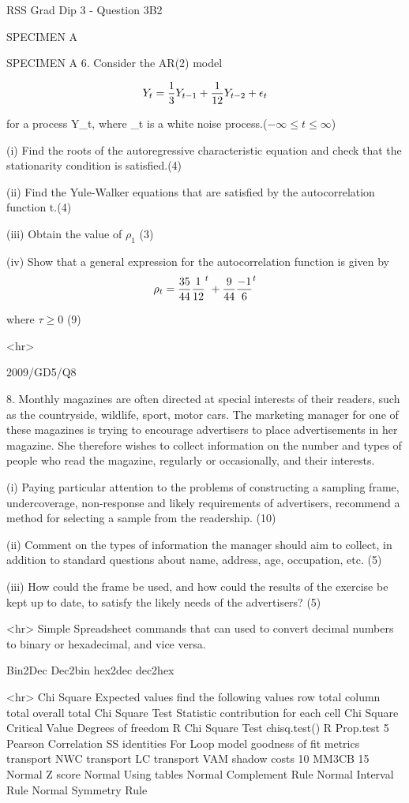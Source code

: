 RSS Grad Dip 3 - Question 3B2
 
 

SPECIMEN A

SPECIMEN A
6. Consider the AR(2) model
 
 
\[Y_t={1\over 3}Y_{t-1}+{1\over 12}Y_{t-2}+ \epsilon_t\]

for a process {Y_t}, where {\epsilon_t} is a white noise process.($-\infty \leq t \leq \infty$)

(i) Find the roots of the autoregressive characteristic equation and check that the stationarity condition is satisfied.(4)
 
(ii) Find the Yule-Walker equations that are satisfied by the autocorrelation function t.(4)
 
(iii) Obtain the value of $\rho_1$        (3)
 
(iv) Show that a general expression for the autocorrelation function is given by
\[\rho_t={35\over 44}{1\over 12}^t +{9\over 44}{-1\over 6}^t
\]

where $\tau \geq 0$     (9)


<hr>

2009/GD5/Q8
 
8. Monthly magazines are often directed at special interests of their readers, such as the countryside, wildlife, sport, motor cars. The marketing manager for one of these magazines is trying to encourage advertisers to place advertisements in her magazine. She therefore wishes to collect information on the number and types of people who read the magazine, regularly or occasionally, and their interests.
 
(i) Paying particular attention to the problems of constructing a sampling frame, undercoverage, non-response and likely requirements of advertisers, recommend a method
for selecting a sample from the readership. (10)
 
(ii) Comment on the types of information the manager should aim to collect, in addition to standard questions about name, address, age, occupation, etc. (5)
 
(iii) How could the frame be used, and how could the results of the exercise be kept up to date, to satisfy the likely needs of the advertisers? (5)

<hr>
Simple Spreadsheet commands that can used to convert decimal numbers to binary or hexadecimal, and vice versa.

Bin2Dec
Dec2bin
hex2dec
dec2hex


<hr>
Chi Square Expected values
find the following values
row total
column total
overall total
Chi Square Test Statistic
   contribution for each cell
Chi Square Critical Value
   Degrees of freedom
R Chi Square Test
chisq.test()
R Prop.test
5
Pearson Correlation SS identities
For Loop
model goodness of fit metrics
transport NWC
transport LC
transport VAM shadow costs
10
MM3CB
15 
Normal Z score
Normal Using tables
Normal Complement Rule
Normal Interval Rule 
Normal Symmetry Rule  


